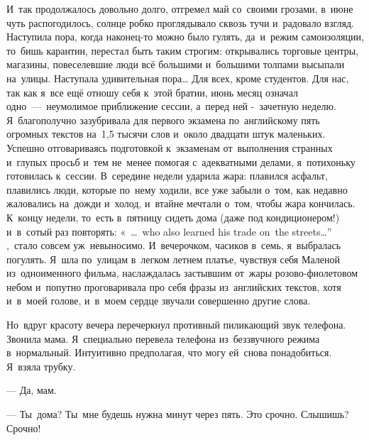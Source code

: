И~так продолжалось довольно долго, отгремел май со~своими грозами, в~июне чуть распогодилось, солнце робко проглядывало сквозь тучи и~радовало взгляд.
Наступила пора, когда наконец-то можно было гулять, да~и~режим самоизоляции, то~бишь карантин, перестал быть таким строгим: открывались торговые центры, магазины, повеселевшие люди всё большими и~большими толпами высыпали на~улицы.
Наступала удивительная пора… Для всех, кроме студентов.
Для нас, так как я~все ещё отношу себя к~этой братии, июнь месяц означал одно~---~неумолимое приближение сессии, а~перед ней -~зачетную неделю.
Я~благополучно зазубривала для первого экзамена по~английскому пять огромных текстов на~1,5 тысячи слов и~около двадцати штук маленьких.
Успешно отговариваясь подготовкой к~экзаменам от~выполнения странных и~глупых просьб и~тем не~менее помогая с~адекватными делами, я~потихоньку готовилась к~сессии.
В~середине недели ударила жара: плавился асфальт, плавились люди, которые по~нему ходили, все уже забыли о~том, как недавно жаловались на~дожди и~холод, и~втайне мечтали о~том, чтобы жара кончилась.
К~концу недели, то~есть в~пятницу сидеть дома (даже под кондиционером!) и~в~сотый раз повторять: «~…~who also learned his trade on~the streets…” ,~стало совсем уж~невыносимо.
И~вечерочком, часиков в~семь, я~выбралась погулять.
Я~шла по~улицам в~легком летнем платье, чувствуя себя Маленой из~одноименного фильма, наслаждалась застывшим от~жары розово-фиолетовом небом и~попутно проговаривала про себя фразы из~английских текстов, хотя и~в~моей голове, и~в~моем сердце звучали совершенно другие слова.
 

Но~вдруг красоту вечера перечеркнул противный пиликающий звук телефона.
Звонила мама.
Я~специально перевела телефона из~беззвучного режима в~нормальный.
Интуитивно предполагая, что могу ей~снова понадобиться.
Я~взяла трубку.
 

--- Да, мам.
 

--- Ты~дома? Ты~мне будешь нужна минут через пять.
Это срочно.
Слышишь? Срочно!


